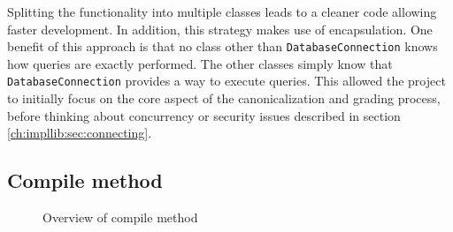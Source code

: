 Splitting the functionality into multiple classes leads to a cleaner code allowing faster development. In addition, this strategy makes use of encapsulation. One benefit of this approach is that no class other than \texttt{DatabaseConnection} knows how queries are exactly performed. The other classes simply know that \texttt{DatabaseConnection} provides a way to execute queries. This allowed the project to initially focus on the core aspect of the canonicalization and grading process, before thinking about concurrency or security issues described in section \ref{ch:impllib:sec:connecting}.

\subsection{Compile method}
\begin{figure}[H]
\caption{Overview of compile method}
\end{figure}

